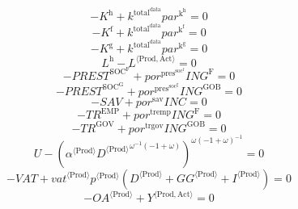 \begin{equation}
-K^{\mathrm{h}} + {k^{\mathrm{total}^{\mathrm{data}}}} {{p\!a\!r}^{\mathrm{k}^{\mathrm{h}}}} = 0
\end{equation}
\begin{equation}
-K^{\mathrm{f}} + {k^{\mathrm{total}^{\mathrm{data}}}} {{p\!a\!r}^{\mathrm{k}^{\mathrm{f}}}} = 0
\end{equation}
\begin{equation}
-K^{\mathrm{g}} + {k^{\mathrm{total}^{\mathrm{data}}}} {{p\!a\!r}^{\mathrm{k}^{\mathrm{g}}}} = 0
\end{equation}
\begin{equation}
L^{\mathrm{h}} - {L}^{\langle \mathrm{Prod},\mathrm{Act}\rangle} = 0
\end{equation}
\begin{equation}
-{P\!R\!E\!S\!T}^{\mathrm{SOC}^{\mathrm{F}}} + {{p\!o\!r}^{\mathrm{pres}^{\mathrm{soc}^{\mathrm{f}}}}} {{I\!N\!G}^{\mathrm{F}}} = 0
\end{equation}
\begin{equation}
-{P\!R\!E\!S\!T}^{\mathrm{SOC}^{\mathrm{G}}} + {{p\!o\!r}^{\mathrm{pres}^{\mathrm{soc}^{\mathrm{g}}}}} {{I\!N\!G}^{\mathrm{GOB}}} = 0
\end{equation}
\begin{equation}
-{S\!A\!V} + {{p\!o\!r}^{\mathrm{sav}}} {{I\!N\!C}} = 0
\end{equation}
\begin{equation}
-{T\!R}^{\mathrm{EMP}} + {{p\!o\!r}^{\mathrm{tremp}}} {{I\!N\!G}^{\mathrm{F}}} = 0
\end{equation}
\begin{equation}
-{T\!R}^{\mathrm{GOV}} + {{p\!o\!r}^{\mathrm{trgov}}} {{I\!N\!G}^{\mathrm{GOB}}} = 0
\end{equation}
\begin{equation}
U - \left({{\alpha}^{\langle \mathrm{\mathrm{Prod}}\rangle}} {{{D}^{\langle \mathrm{Prod}\rangle}}^{{\omega}^{-1} \left(-1 + \omega\right)}}\right)^{{\omega} \left(-1 + \omega\right)^{-1}} = 0
\end{equation}
\begin{equation}
-{V\!A\!T} + {{{v\!a\!t}}^{\langle \mathrm{\mathrm{Prod}}\rangle}} {{p}^{\langle \mathrm{Prod}\rangle}} \left({D}^{\langle \mathrm{Prod}\rangle} + {{G\!G}}^{\langle \mathrm{Prod}\rangle} + {I}^{\langle \mathrm{Prod}\rangle}\right) = 0
\end{equation}
\begin{equation}
-{{O\!A}}^{\langle \mathrm{Prod}\rangle} + {Y}^{\langle \mathrm{Prod},\mathrm{Act}\rangle} = 0
\end{equation}
